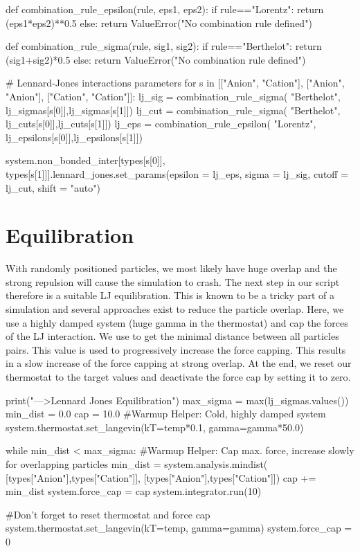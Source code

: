 \documentclass[
a4paper,                        %
11pt,                           %
twoside,                        %
footsepline,                    %
headsepline,                    %
headexclude,                    %
footexclude,                    %
pagesize,                       %
]{scrartcl}
\begin{document}
\begin{pypresso}
def combination_rule_epsilon(rule, eps1, eps2):
    if rule=="Lorentz":
        return (eps1*eps2)**0.5
    else:
        return ValueError("No combination rule defined")

def combination_rule_sigma(rule, sig1, sig2):
    if rule=="Berthelot":
        return (sig1+sig2)*0.5
    else:
        return ValueError("No combination rule defined")

# Lennard-Jones interactions parameters 
for s in [["Anion", "Cation"], 
          ["Anion", "Anion"], 
          ["Cation", "Cation"]]:
        lj_sig = combination_rule_sigma(
                "Berthelot",
                lj_sigmas[s[0]],lj_sigmas[s[1]])
        lj_cut = combination_rule_sigma(
                "Berthelot",
                lj_cuts[s[0]],lj_cuts[s[1]])
        lj_eps = combination_rule_epsilon(
                "Lorentz",
                lj_epsilons[s[0]],lj_epsilons[s[1]])

        system.non_bonded_inter[types[s[0]], types[s[1]]].lennard_jones.set_params(epsilon = lj_eps, sigma = lj_sig, cutoff = lj_cut, shift = "auto")

\end{pypresso}

\section{Equilibration}

With randomly positioned particles, we most likely have huge overlap and the strong repulsion will
cause the simulation to crash. The next step in our script therefore is a suitable LJ equilibration.
This is known to be a tricky part of a simulation and several approaches exist to reduce the particle overlap.
Here, we use a highly damped system (huge gamma in the thermostat) and cap the forces of the LJ interaction.
We use  to get the minimal distance between all particles pairs. This value
is used to progressively increase the force capping. This results in a slow increase of the force capping at
strong overlap. At the end, we reset our thermostat to the target values and deactivate the force cap by setting 
it to zero.

\begin{pypresso}
print("\n--->Lennard Jones Equilibration")
max_sigma = max(lj_sigmas.values())
min_dist = 0.0
cap = 10.0
#Warmup Helper: Cold, highly damped system
system.thermostat.set_langevin(kT=temp*0.1, gamma=gamma*50.0)

while min_dist < max_sigma:
    #Warmup Helper: Cap max. force, increase slowly for overlapping particles
    min_dist = system.analysis.mindist(
            [types["Anion"],types["Cation"]],
            [types["Anion"],types["Cation"]])
    cap += min_dist
    system.force_cap = cap
    system.integrator.run(10)

#Don't forget to reset thermostat and force cap
system.thermostat.set_langevin(kT=temp, gamma=gamma)
system.force_cap = 0
\end{pypresso}
\end{document}
